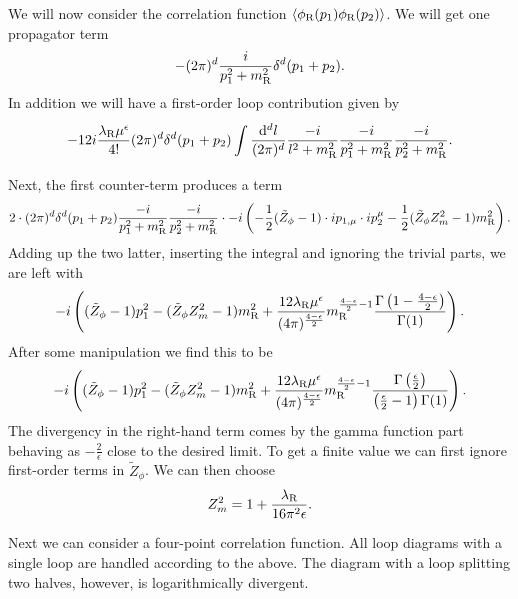 We will now consider the correlation function $\expval{\phi_{\ensuremath{\text{R}}}(p_{1})\phi_{\ensuremath{\text{R}}}(p_{2})}$. We will get one propagator term
\begin{align*}
	-(2\pi)^{d}\frac{i}{p_{1}^{2} + m_{\text{R}}^{2}}\delta^{d}(p_{1} + p_{2}).
\end{align*}
In addition we will have a first-order loop contribution given by
\begin{align*}
	-12i\frac{\lambda_{\text{R}}\mu^{\epsilon}}{4!}(2\pi)^{d}\delta^{d}(p_{1} + p_{2})\int\limits_{}^{}\frac{\dd[d]{l}}{(2\pi)^{d}}\frac{-i}{l^{2} + m_{\text{R}}^{2}}\frac{-i}{p_{1}^{2} + m_{\text{R}}^{2}}\frac{-i}{p_{2}^{2} + m_{\text{R}}^{2}}.
\end{align*}
Next, the first counter-term produces a term
\begin{align*}
	2\cdot (2\pi)^{d}\delta^{d}(p_{1} + p_{2})\frac{-i}{p_{1}^{2} + m_{\text{R}}^{2}}\frac{-i}{p_{2}^{2} + m_{\text{R}}^{2}}\cdot -i\left(-\frac{1}{2}(\tilde{Z}_{\phi} - 1)\cdot ip_{1, \mu}\cdot ip_{2}^{\mu} - \frac{1}{2}(\tilde{Z}_{\phi}Z_{m}^{2} - 1)m_{\text{R}}^{2}\right).
\end{align*}
Adding up the two latter, inserting the integral and ignoring the trivial parts, we are left with
\begin{align*}
	-i\left((\tilde{Z}_{\phi} - 1)p_{1}^{2} - (\tilde{Z}_{\phi}Z_{m}^{2} - 1)m_{\text{R}}^{2} + \frac{12\lambda_{\text{R}}\mu^{\epsilon}}{(4\pi)^{\frac{4 - \epsilon}{2}}}m_{\text{R}}^{\frac{4 - \epsilon}{2} - 1}\frac{\Gamma\left(1 - \frac{4 - \epsilon}{2}\right)}{\Gamma(1)}\right).
\end{align*}
After some manipulation we find this to be
\begin{align*}
	-i\left((\tilde{Z}_{\phi} - 1)p_{1}^{2} - (\tilde{Z}_{\phi}Z_{m}^{2} - 1)m_{\text{R}}^{2} + \frac{12\lambda_{\text{R}}\mu^{\epsilon}}{(4\pi)^{\frac{4 - \epsilon}{2}}}m_{\text{R}}^{\frac{4 - \epsilon}{2} - 1}\frac{\Gamma\left(\frac{\epsilon}{2}\right)}{\left(\frac{\epsilon}{2} - 1\right)\Gamma(1)}\right).
\end{align*}
The divergency in the right-hand term comes by the gamma function part behaving as $-\frac{2}{\epsilon}$ close to the desired limit. To get a finite value we can first ignore first-order terms in $\tilde{Z}_{\phi}$. We can then choose
\begin{align*}
	Z_{m}^{2} = 1 + \frac{\lambda_{\text{R}}}{16\pi^{2}\epsilon}.
\end{align*}

Next we can consider a four-point correlation function. All loop diagrams with a single loop are handled according to the above. The diagram with a loop splitting two halves, however, is logarithmically divergent.

